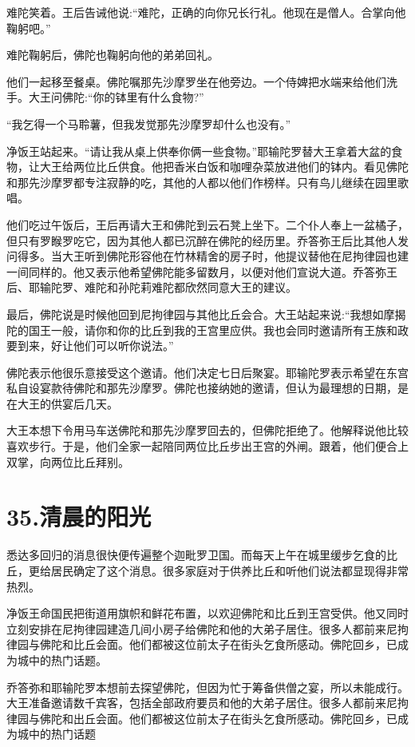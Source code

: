 \documentclass[12pt,twoside,openany]{book}
\begin{document}
难陀笑着。王后告诫他说:“难陀，正确的向你兄长行礼。他现在是僧人。合掌向他鞠躬吧。”

难陀鞠躬后，佛陀也鞠躬向他的弟弟回礼。

他们一起移至餐桌。佛陀嘱那先沙摩罗坐在他旁边。一个侍婢把水端来给他们洗手。大王问佛陀:“你的钵里有什么食物?”

“我乞得一个马聆薯，但我发觉那先沙摩罗却什么也没有。”

净饭王站起来。“请让我从桌上供奉你俩一些食物。”耶输陀罗替大王拿着大盆的食物，让大王给两位比丘供食。他把香米白饭和咖哩杂菜放进他们的钵内。看见佛陀和那先沙摩罗都专注寂静的吃，其他的人都以他们作榜样。只有鸟儿继续在园里歌唱。

他们吃过午饭后，王后再请大王和佛陀到云石凳上坐下。二个仆人奉上一盆橘子，但只有罗睺罗吃它，因为其他人都已沉醉在佛陀的经历里。乔答弥王后比其他人发问得多。当大王听到佛陀形容他在竹林精舍的房子时，他提议替他在尼拘律园也建一间同样的。他又表示他希望佛陀能多留数月，以便对他们宣说大道。乔答弥王后、耶输陀罗、难陀和孙陀莉难陀都欣然同意大王的建议。

最后，佛陀说是时候他回到尼拘律园与其他比丘会合。大王站起来说:“我想如摩揭陀的国王一般，请你和你的比丘到我的王宫里应供。我也会同时邀请所有王族和政要到来，好让他们可以听你说法。”

佛陀表示他很乐意接受这个邀请。他们决定七日后聚宴。耶输陀罗表示希望在东宫私自设宴款待佛陀和那先沙摩罗。佛陀也接纳她的邀请，但认为最理想的日期，是在大王的供宴后几天。

大王本想下令用马车送佛陀和那先沙摩罗回去的，但佛陀拒绝了。他解释说他比较喜欢步行。于是，他们全家一起陪同两位比丘步出王宫的外闸。跟着，他们便合上双掌，向两位比丘拜别。


\chapter{35.清晨的阳光}\label{ch35}

悉达多回归的消息很快便传遍整个迦毗罗卫国。而每天上午在城里缓步乞食的比丘，更给居民确定了这个消息。很多家庭对于供养比丘和听他们说法都显现得非常热烈。

净饭王命国民把街道用旗帜和鲜花布置，以欢迎佛陀和比丘到王宫受供。他又同时立刻安排在尼拘律园建造几间小房子给佛陀和他的大弟子居住。很多人都前来尼拘律园与佛陀和比丘会面。他们都被这位前太子在街头乞食所感动。佛陀回乡，已成为城中的热门话题。

乔答弥和耶输陀罗本想前去探望佛陀，但因为忙于筹备供僧之宴，所以未能成行。大王准备邀请数千宾客，包括全部政府要员和他的大弟子居住。很多人都前来尼拘律园与佛陀和出丘会面。他们都被这位前太子在街头乞食所感动。佛陀回乡，已成为城中的热门话题
\end{document}
